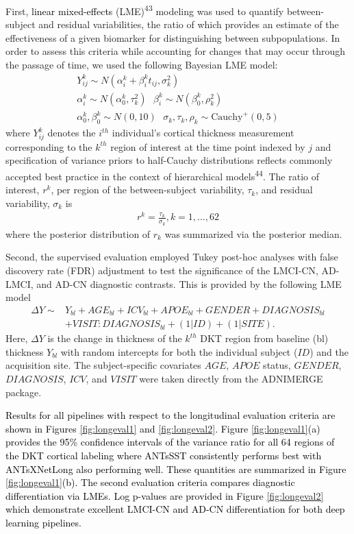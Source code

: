 \documentclass[12pt,]{article}
\begin{document}
First, \textcolor{black}{linear mixed-effects} (LME)\textsuperscript{43}
modeling was used to quantify between-subject and residual
variabilities, the ratio of which provides an estimate of the
effectiveness of a given biomarker for distinguishing between
subpopulations. In order to assess this criteria while accounting for
changes that may occur through the passage of time, we used the
following Bayesian LME model: \begin{gather}
  Y^k_{ij} \sim N(\alpha^k_i + \beta^k_i t_{ij}, \sigma_k^2) \\ \nonumber
  \alpha^k_i \sim N(\alpha^k_0, \tau^2_k) \,\,\,\, \beta^k_i \sim N(\beta^k_0, \rho^2_k) \\ \nonumber
  \alpha^k_0, \beta^k_0 \sim N(0,10) \,\,\,\,  \sigma_k, \tau_k, \rho_k \sim \mbox{Cauchy}^+ (0, 5)
\end{gather} where \(Y^k_{ij}\) denotes the \(i^{th}\) individual's
cortical thickness measurement corresponding to the \(k^{th}\) region of
interest at the time point indexed by \(j\) and specification of
variance priors to half-Cauchy distributions reflects commonly accepted
best practice in the context of hierarchical models\textsuperscript{44}.
The ratio of interest, \(r^k\), per region of the between-subject
variability, \(\tau_k\), and residual variability, \(\sigma_k\) is
\begin{align}
  r^k = \frac{\tau_k}{\sigma_k}, k = 1,\ldots,62
\end{align} where the posterior distribution of \(r_k\) was summarized
via the posterior median.

Second, the supervised evaluation employed Tukey post-hoc analyses with
false discovery rate (FDR) adjustment to test the significance of the
LMCI-CN, AD-LMCI, and AD-CN diagnostic contrasts. This is provided by
the following LME model \begin{align}
  \Delta Y \sim & Y_{bl} + AGE_{bl} + ICV_{bl} + APOE_{bl} + GENDER + DIAGNOSIS_{bl} \\ \nonumber
                & + VISIT:DIAGNOSIS_{bl} + (1 | ID) + (1 | SITE).
\end{align} Here, \(\Delta Y\) is the change in thickness of the
\(k^{th}\) DKT region from baseline (bl) thickness \(Y_{bl}\) with
random intercepts for both the individual subject (\(ID\)) and the
acquisition site. The subject-specific covariates \(AGE\), \(APOE\)
status, \(GENDER\), \(DIAGNOSIS\), \(ICV\), and \(VISIT\) were taken
directly from the ADNIMERGE package.

\textcolor{black}{Results for all pipelines with respect to the longitudinal
evaluation criteria are shown in Figures \ref{fig:longeval1} and
\ref{fig:longeval2}.  Figure \ref{fig:longeval1}(a) provides the 95\% confidence
intervals of the variance ratio for all 64 regions of the DKT cortical labeling
where ANTsSST consistently performs best with ANTsXNetLong also performing
well.  These quantities are summarized in Figure \ref{fig:longeval1}(b).  The
second evaluation criteria compares diagnostic differentiation via LMEs.  Log
p-values are provided in Figure \ref{fig:longeval2} which demonstrate excellent
LMCI-CN and AD-CN differentiation for both deep learning pipelines.}
\end{document}
